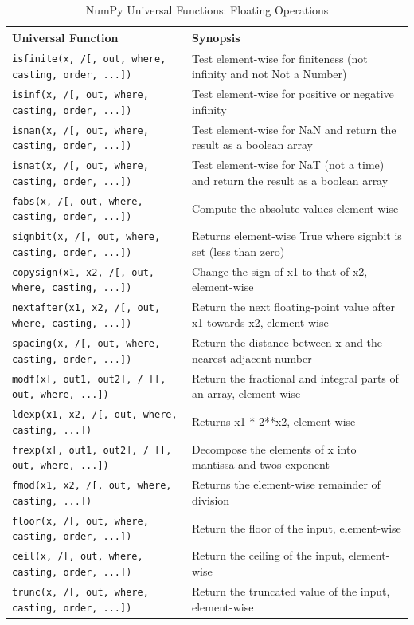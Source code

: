 \documentclass[a4paper,11pt]{book}
\begin{document}
\begin{appendices}
\begin{table}
\caption{NumPy Universal Functions: Floating Operations}
\centering
\begin{tabular}{lp{14cm}}
\toprule \toprule 
Universal Function & Synopsis \\
\midrule
\texttt{isfinite(x, /[, out, where, casting, order, ...])}& Test element-wise for finiteness (not infinity and not Not a Number)\\
\texttt{isinf(x, /[, out, where, casting, order, ...])}&  Test element-wise for positive or negative infinity\\
\texttt{isnan(x, /[, out, where, casting, order, ...])}& Test element-wise for NaN and return the result as a boolean array\\
\texttt{isnat(x, /[, out, where, casting, order, ...])}& Test element-wise for NaT (not a time) and return the result as a boolean array\\
\texttt{fabs(x, /[, out, where, casting, order, ...])}& Compute the absolute values element-wise\\
\texttt{signbit(x, /[, out, where, casting, order, ...])}& Returns element-wise True where signbit is set (less than zero)\\
\texttt{copysign(x1, x2, /[, out, where, casting, ...])}& Change the sign of x1 to that of x2, element-wise\\
\texttt{nextafter(x1, x2, /[, out, where, casting, ...])}& Return the next floating-point value after x1 towards x2, element-wise\\
\texttt{spacing(x, /[, out, where, casting, order, ...])}& Return the distance between x and the nearest adjacent number\\
\texttt{modf(x[, out1, out2], / [[, out, where, ...])}& Return the fractional and integral parts of an array, element-wise\\
\texttt{ldexp(x1, x2, /[, out, where, casting, ...])}& Returns x1 * 2**x2, element-wise\\
\texttt{frexp(x[, out1, out2], / [[, out, where, ...])}& Decompose the elements of x into mantissa and twos exponent\\
\texttt{fmod(x1, x2, /[, out, where, casting, ...])}& Returns the element-wise remainder of division\\
\texttt{floor(x, /[, out, where, casting, order, ...])}& Return the floor of the input, element-wise\\
\texttt{ceil(x, /[, out, where, casting, order, ...])}& Return the ceiling of the input, element-wise\\
\texttt{trunc(x, /[, out, where, casting, order, ...])}& Return the truncated value of the input, element-wise\\
\bottomrule
\end{tabular}
\end{table}
\clearpage


\end{appendices}
\end{document}
